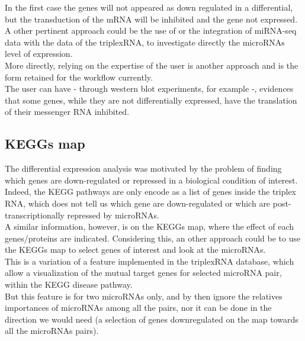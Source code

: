 \documentclass[a4paper,12pt]{report}
\begin{document}
In the first case the genes will not appeared as down regulated in a differential, but the transduction of the mRNA will be inhibited and the gene not expressed.\\

A other pertinent approach could be the use of or the integration of miRNA-seq data with the data of the triplexRNA, to investigate directly the microRNAs level of expression.\\
 
More directly, relying on the expertise of the user is another approach and is the form retained for the workflow currently. \\

The user can have - through western blot experiments, for example -, evidences that some genes, while they are not differentially expressed, have the translation of their messenger RNA inhibited.\\

\subsection{KEGGs map}

The differential expression analysis was motivated by the problem of finding which genes are down-regulated or repressed in a biological condition of interest.\\

Indeed, the KEGG pathways are only encode as a list of genes inside the triplex RNA, which does not tell us which gene are down-regulated or which are post-transcriptionally repressed by microRNAs.\\

A similar information, however, is on the KEGGs map, where the effect of each genes/proteins are indicated. Considering this, an other approach could be to use the KEGGs map to select genes of interest and look at the microRNAs.\\

This is a variation of a feature implemented in the triplexRNA database, which allow a visualization of the mutual target genes for selected microRNA pair, within the KEGG disease pathway. \\

But this feature is for two microRNAs only, and by then ignore the relatives importances of microRNAs among all the pairs, nor it can be done in the direction we would need (a selection of genes downregulated on the map towards all the microRNAs pairs).\\
\end{document}

